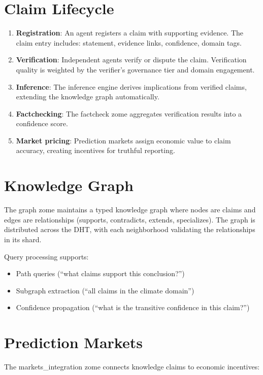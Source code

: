 \documentclass[12pt]{book}
\begin{document}
\section{Claim Lifecycle}

\begin{enumerate}
  \item \textbf{Registration}: An agent registers a claim with supporting evidence.
    The claim entry includes: statement, evidence links, confidence, domain tags.
  \item \textbf{Verification}: Independent agents verify or dispute the claim.
    Verification quality is weighted by the verifier's governance tier and
    domain engagement.
  \item \textbf{Inference}: The inference engine derives implications from
    verified claims, extending the knowledge graph automatically.
  \item \textbf{Factchecking}: The factcheck zome aggregates verification
    results into a confidence score.
  \item \textbf{Market pricing}: Prediction markets assign economic value to
    claim accuracy, creating incentives for truthful reporting.
\end{enumerate}

\section{Knowledge Graph}

The graph zome maintains a typed knowledge graph where nodes are claims and
edges are relationships (supports, contradicts, extends, specializes). The
graph is distributed across the DHT, with each neighborhood validating the
relationships in its shard.

Query processing supports:
\begin{itemize}
  \item Path queries (``what claims support this conclusion?'')
  \item Subgraph extraction (``all claims in the climate domain'')
  \item Confidence propagation (``what is the transitive confidence in this claim?'')
\end{itemize}


\section{Prediction Markets}

The markets\_integration zome connects knowledge claims to economic incentives:
\end{document}
